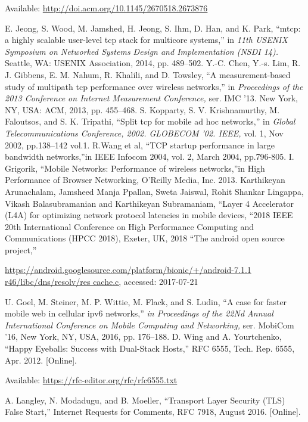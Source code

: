 \begin{multicols}{2}
{\begin{thebibliography}{99}
 Available: \url{http://doi.acm.org/10.1145/2670518.2673876}

 E. Jeong, S. Wood, M. Jamshed, H. Jeong, S. Ihm, D. Han, and K. Park, ``mtcp: a highly scalable user-level tcp stack for multicore systems,” in \textit{11th USENIX Symposium on Networked Systems Design and Implementation (NSDI 14).} Seattle, WA: USENIX Association, 2014, pp. 489–502.
 Y.-C. Chen, Y.-s. Lim, R. J. Gibbens, E. M. Nahum, R. Khalili, and D. Towsley, ``A measurement-based study of multipath tcp performance over wireless networks,” in \textit{Proceedings of the 2013 Conference on Internet Measurement Conference,} ser. IMC ’13. New York, NY, USA: ACM, 2013, pp. 455–468.
 S. Kopparty, S. V. Krishnamurthy, M. Faloutsos, and S. K. Tripathi, ``Split tcp for mobile ad hoc networks,” in \textit{Global Telecommunications Conference, 2002. GLOBECOM ’02. IEEE,} vol. 1, Nov 2002, pp.138–142 vol.1.
 R.Wang et al, ``TCP startup performance in large bandwidth networks,”in IEEE Infocom 2004, vol. 2, March 2004, pp.796-805.
 I. Grigorik, ``Mobile Networks: Performance of wireless networks,”in High Performance of Browser Networking, O’Reilly Media, Inc. 2013.
 Karthikeyan Arunachalam, Jamsheed Manja Ppallan, Sweta Jaiswal, Rohit Shankar Lingappa, Vikash Balasubramanian and Karthikeyan Subramaniam, “Layer 4 Accelerator (L4A) for optimizing network protocol latencies in mobile devices, “2018 IEEE 20th International Conference on High Performance Computing and Communications (HPCC 2018), Exeter, UK, 2018
 “The android open source project,”

 \url{https://android.googlesource.com/platform/bionic/+/android-7.1.1 r46/libc/dns/resolv/res cache.c,} accessed: 2017-07-21

 U. Goel, M. Steiner, M. P. Wittie, M. Flack, and S. Ludin, “A case for faster mobile web in cellular ipv6 networks,” \textit{in Proceedings of the 22Nd Annual International Conference on Mobile Computing and Networking,} ser. MobiCom ’16, New York, NY, USA, 2016, pp. 176–188.
 D. Wing and A. Yourtchenko, “Happy Eyeballs: Success with Dual-Stack Hosts,” RFC 6555, Tech. Rep. 6555, Apr. 2012. [Online]. 

Available: \url{https://rfc-editor.org/rfc/rfc6555.txt}

 A. Langley, N. Modadugu, and B. Moeller, “Transport Layer Security (TLS) False Start,” Internet Requests for Comments, RFC 7918, August 2016. [Online]. 


\end{thebibliography}}
\end{multicols}
